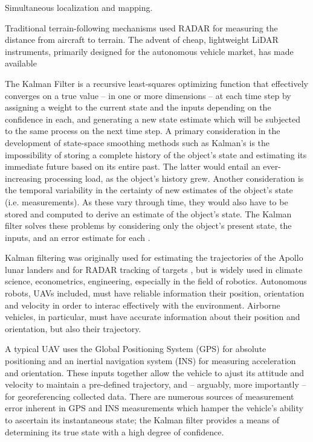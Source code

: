 \documentclass[10pt,a4paper]{report}
\begin{document}
Simultaneous localization and mapping.

Traditional terrain-following mechanisms used RADAR for measuring the distance from aircraft to terrain. The advent of cheap, lightweight LiDAR instruments, primarily designed for the autonomous vehicle market, has made available 


The Kalman Filter \cite{Kalman1960} is a recursive least-squares optimizing function that effectively converges on a true value -- in one or more dimensions -- at each time step by assigning a weight to the current state and the inputs depending on the confidence in each, and generating a new state estimate which will be subjected to the same process on the next time step. A primary consideration in the development of state-space smoothing methods such as Kalman's is the impossibility of storing a complete history of the object's state and estimating its immediate future based on its entire past. The latter would entail an ever-increasing processing load, as the object's history grew. Another consideration is the temporal variability in the certainty of new estimates of the object's state (i.e. measurements). As these vary through time, they would also have to be stored and computed to derive an estimate of the object's state. The Kalman filter solves these problems by considering only the object's present state, the inputs, and an error estimate for each \cite{Swerling1959}. 

Kalman filtering was originally used for estimating the trajectories of the Apollo lunar landers and for RADAR tracking of targets \cite{Grewal2010}, but is widely used in climate science, econometrics, engineering, especially in the field of robotics. Autonomous robots, UAVs included, must have reliable information their position, orientation and velocity in order to interac effectively with the environment. Airborne vehicles, in particular, must have accurate information about their position and orientation, but also their trajectory.

A typical UAV uses the Global Positioning System (GPS) for absolute positioning and an inertial navigation system (INS) for measuring acceleration and orientation. These inputs together allow the vehicle to ajust its attitude and velocity to maintain a pre-defined trajectory, and -- arguably, more importantly -- for georeferencing collected data. There are numerous sources of measurement error inherent in GPS and INS measurements which hamper the vehicle's ability to ascertain its instantaneous state; the Kalman filter provides a means of determining its true state with a high degree of confidence.
\end{document}
